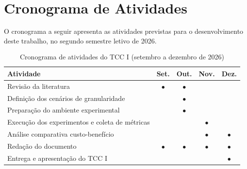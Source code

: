 

\apendices
    \chapter{Cronograma de Atividades}
    	\label{apen:cronograma}

    O cronograma a seguir apresenta as atividades previstas para o desenvolvimento deste trabalho, no segundo semestre letivo de 2026.

    \begin{table}[htb]
        \centering
        \caption{Cronograma de atividades do TCC I (setembro a dezembro de 2026)}
        \label{tab:cronograma}
        \begin{tabular}{l c c c c}
            \toprule
            \textbf{Atividade} & \textbf{Set.} & \textbf{Out.} & \textbf{Nov.} & \textbf{Dez.} \\
            \midrule
            Revisão da literatura & $\bullet$ & $\bullet$ & & \\
            Definição dos cenários de granularidade & & $\bullet$ & & \\
            Preparação do ambiente experimental & & $\bullet$ & & \\
            Execução dos experimentos e coleta de métricas & & & $\bullet$ & \\
            Análise comparativa custo-benefício & & & $\bullet$ & $\bullet$ \\
            Redação do documento & $\bullet$ & $\bullet$ & $\bullet$ & $\bullet$ \\
            Entrega e apresentação do TCC I & & & & $\bullet$ \\
            \bottomrule
        \end{tabular}
    \end{table}

